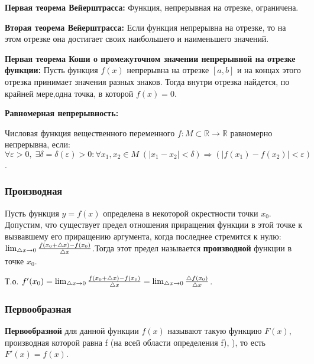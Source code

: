 \documentclass[12pt]{matmex-diploma}
\begin{document}
            \textbf{Первая теорема Вейерштрасса: }
            Функция, непрерывная на отрезке, ограничена.
            
            \textbf{Вторая теорема Вейерштрасса: }
            Если функция непрерывна на отрезке, то на этом отрезке она достигает своих наибольшего и наименьшего значений.
            
            \textbf{Первая теорема Коши о промежуточном значении непрерывной на отрезке функции: }
            Пусть функция $f(x)$ непрерывна на отрезке $\left[ {a , b} \right]$ и на концах этого отрезка принимает значения разных знаков. Тогда внутри отрезка найдется, по крайней мере,одна точка, в которой $f(x) = 0$. 
            
            \textbf{Равномерная непрерывность:}
            
            Числовая функция вещественного переменного $f \colon M \subset \mathbb R \to \mathbb R$ равномерно непрерывна, если:
            $\forall \varepsilon>0, \; \exists \delta=\delta(\varepsilon)>0 : \forall x_1, x_2 \in M \; (|x_1 - x_2| < \delta) \Rightarrow (|f(x_1) - f(x_2)| < \varepsilon)$.
            
        \subsubsection*{Производная}
        
            Пусть функция $y=f(x)$  определена в некоторой окрестности точки $x_0$. Допустим, что существует предел отношения приращения функции в этой точке к вызвавшему его приращению аргумента, когда последнее стремится к нулю: $\lim_{\bigtriangleup x \to 0}{{f(x_0 + \bigtriangleup x) - f(x_0)} \over \bigtriangleup x}$.Тогда этот предел называется \textbf{производной} функции в точке $x_0$.
            
            Т.о. $f'(x_0) = \lim_{\bigtriangleup x \to 0}{{f(x_0 + \bigtriangleup x) - f(x_0)} \over \bigtriangleup x} = \lim_{\bigtriangleup x \to 0}{{\bigtriangleup f(x_0)} \over \bigtriangleup x}$.
            
        \subsubsection*{Первообразная}
        
            \textbf{Первообразной} для данной функции $f(x)$  называют такую функцию $F(x)$, производная которой равна f (на всей области определения f), ), то есть $F'(x) = f(x)$.
            
\end{document}
